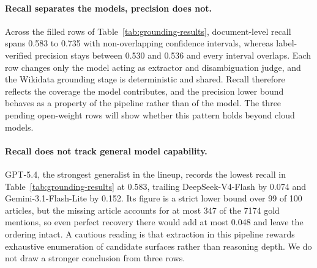 

\paragraph{Recall separates the models, precision does not.}
Across the filled rows of Table~\ref{tab:grounding-results}, document-level
recall spans 0.583 to 0.735 with non-overlapping confidence intervals,
whereas label-verified precision stays between 0.530 and 0.536 and every
interval overlaps. Each row changes only the model acting as extractor and
disambiguation judge, and the Wikidata grounding stage is deterministic and
shared. Recall therefore reflects the coverage the model contributes, and
the precision lower bound behaves as a property of the pipeline rather than
of the model. The three pending open-weight rows will show whether this
pattern holds beyond cloud models.

\paragraph{Recall does not track general model capability.}
GPT-5.4, the strongest generalist in the lineup, records the lowest recall
in Table~\ref{tab:grounding-results} at 0.583, trailing DeepSeek-V4-Flash by
0.074 and Gemini-3.1-Flash-Lite by 0.152. Its figure is a strict lower bound
over 99 of 100 articles, but the missing article accounts for at most 347 of
the 7174 gold mentions, so even perfect recovery there would add at most
0.048 and leave the ordering intact. A cautious reading is that extraction
in this pipeline rewards exhaustive enumeration of candidate surfaces rather
than reasoning depth. We do not draw a stronger conclusion from three rows.

